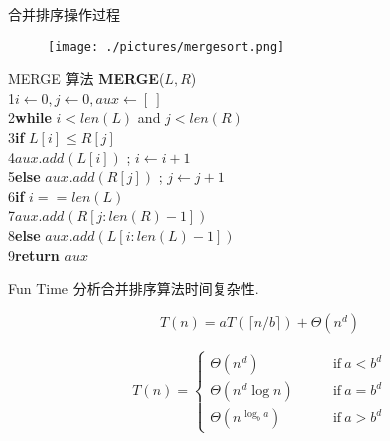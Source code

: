 \documentclass[fontset=fandol,UTF8,fleqn]{beamer}
\begin{document}
\begin{frame}{合并排序操作过程}
\begin{figure}
  \centering
  \texttt{[image: ./pictures/mergesort.png]}%
\end{figure}
\end{frame}

\begin{frame}{\textsf{MERGE} 算法}
\textbf{\textsc{MERGE}}($L, R$)\\
1\quad $i \gets 0, j \gets 0, aux \gets [\ ]$ \\
2\quad \textbf{while} $i < len(L)$ and $j < len(R)$\\
3\quad \quad \textbf{if} $L[i]\leq R[j]$\\
4\qquad \qquad  $aux.add(L[i])$ ; $i\gets i+1$\\
5\qquad  \textbf{else} $aux.add(R[j])$ ; $j\gets j+1$\\
6\qquad  \textbf{if} $i == len(L)$ \\
7\qquad  \qquad $aux.add(R[j:len(R)-1])$ \\
8\qquad  \textbf{else}  $aux.add(L[i:len(L)-1])$  \\
9\quad \textbf{return} $aux$
\end{frame}

\begin{frame}{Fun Time}
分析合并排序算法时间复杂性.
\begin{exampleblock}{}
  \begin{displaymath}
   T(n)=aT(\lceil n/b \rceil)+\Theta(n^d)
 \end{displaymath}
\end{exampleblock}
\begin{exampleblock}{}
  \begin{eqnarray*}
    T(n) = \left\{
        \begin{array}{ll}
          \Theta(n^d) &\qquad  \mathrm{if}\ a < b^d   \\
\Theta(n^d\log n) &\qquad  \mathrm{if} \ a = b^d   \\
\Theta(n^{\log_ba}) &\qquad  \mathrm{if}\ a > b^d  
        \end{array}
\right. 
  \end{eqnarray*}
\end{exampleblock}
\end{frame}
\end{document}
